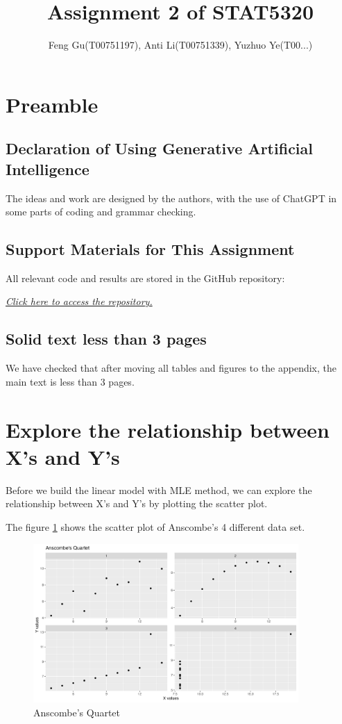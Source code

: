 \documentclass[12pt]{article}
\title{
Assignment 2 of STAT5320
}
\author{Feng Gu(T00751197), Anti Li(T00751339), Yuzhuo Ye(T00...)}
\begin{document}
\maketitle

\section{Preamble}
\subsection{Declaration of Using Generative Artificial Intelligence}
The ideas and work are designed by the authors, with the use of ChatGPT in some parts of coding and grammar checking.

\subsection{Support Materials for This Assignment}
All relevant code and results are stored in the GitHub repository:

\href{https://github.com/Gufeng-2002/5320_assignment_2.git}
{\textit{Click here to access the repository.}}

\subsection{Solid text less than 3 pages}
We have checked that after moving all tables and figures to the appendix, the main text is less than 3 pages.


\section{Explore the relationship between X's and Y's}

Before we build the linear model with MLE method, we can explore the relationship
between X's and Y's by plotting the scatter plot.

The figure \ref{fig:anscombe_quartet} shows the scatter plot of Anscombe's 4 different 
data set.

\begin{figure}[!h]
    \centering
    \includegraphics[width=0.9\textwidth]{../results/anscombe_quartet.png}
    \caption{Anscombe's Quartet}
    \label{fig:anscombe_quartet}
\end{figure}
\end{document}
